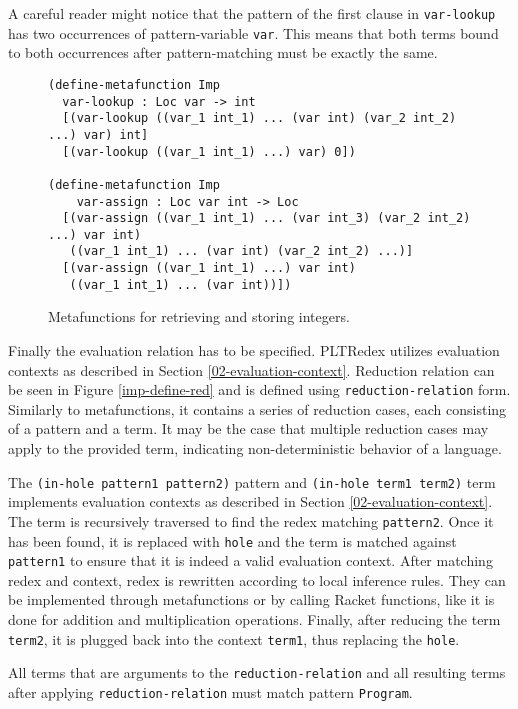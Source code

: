 A careful reader might notice that the pattern of the first clause in \texttt{var-lookup} has two occurrences of pattern-variable \texttt{var}. This means that both terms bound to both occurrences after pattern-matching must be exactly the same.

\begin{figure}[h]
\begin{verbatim}
(define-metafunction Imp
  var-lookup : Loc var -> int
  [(var-lookup ((var_1 int_1) ... (var int) (var_2 int_2) ...) var) int]
  [(var-lookup ((var_1 int_1) ...) var) 0])

(define-metafunction Imp
    var-assign : Loc var int -> Loc
  [(var-assign ((var_1 int_1) ... (var int_3) (var_2 int_2) ...) var int)
   ((var_1 int_1) ... (var int) (var_2 int_2) ...)]
  [(var-assign ((var_1 int_1) ...) var int)
   ((var_1 int_1) ... (var int))])
\end{verbatim}
\caption{Metafunctions for retrieving and storing integers.}
\label{imp-define-mf}
\end{figure}

Finally the evaluation relation has to be specified. PLTRedex utilizes evaluation contexts as described in Section \ref{02-evaluation-context}. Reduction relation can be seen in Figure \ref{imp-define-red} and is defined using \texttt{reduction-relation} form. Similarly to metafunctions, it contains a series of reduction cases, each consisting of a pattern and a term. It may be the case that multiple reduction cases may apply to the provided term, indicating non-deterministic behavior of a language.

The \texttt{(in-hole pattern1 pattern2)} pattern and \texttt{(in-hole term1 term2)} term implements evaluation contexts as described in Section \ref{02-evaluation-context}. The term is recursively traversed to find the redex matching \texttt{pattern2}. Once it has been found, it is replaced with \texttt{hole} and the term is matched against \texttt{pattern1} to ensure that it is indeed a valid evaluation context. After matching redex and context, redex is rewritten according to local inference rules. They can be implemented through metafunctions or by calling Racket functions, like it is done for addition and multiplication operations. Finally, after reducing the term \texttt{term2}, it is plugged back into the context \texttt{term1}, thus replacing the \texttt{hole}.

All terms that are arguments to the \texttt{reduction-relation} and all resulting terms after applying \texttt{reduction-relation} must match pattern \texttt{Program}.

